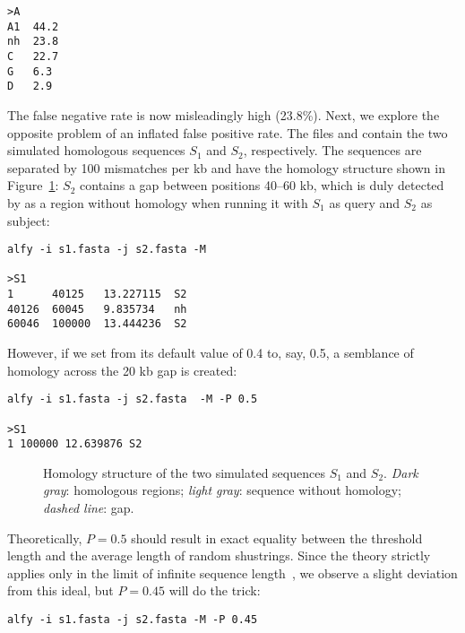 \documentclass[a4paper]{article}
\begin{document}
\begin{itemize}
\begin{verbatim}
>A
A1  44.2
nh  23.8
C   22.7
G   6.3
D   2.9
\end{verbatim}
The false negative rate is now misleadingly high (23.8\%).
\I Next, we explore the opposite problem of an inflated false positive
rate. The files  and  contain the two
simulated homologous sequences $S_1$ and $S_2$, respectively. The sequences are
separated by 100 mismatches per kb and have the homology structure
shown in Figure~\ref{fig:hom}: $S_2$ contains a gap between positions
40--60 kb, which is duly detected by  as a region without homology when
running it with $S_1$ as query and $S_2$ as subject:
\begin{verbatim}
alfy -i s1.fasta -j s2.fasta -M

>S1
1      40125   13.227115  S2
40126  60045   9.835734   nh
60046  100000  13.444236  S2
\end{verbatim}
However, if we set  from its default value of 0.4 to, say, 0.5,
a semblance of homology across the 20 kb gap is created:
\begin{verbatim}
alfy -i s1.fasta -j s2.fasta  -M -P 0.5

>S1
1 100000 12.639876 S2
\end{verbatim}
\begin{figure}
\begin{center}

\end{center}
\caption{Homology structure of the two simulated sequences $S_1$ and
  $S_2$. \textit{Dark gray}: homologous regions; \textit{light gray}:
  sequence without homology; \textit{dashed line}: gap.}\label{fig:hom}
\end{figure}

\I Theoretically, $P=0.5$ should result in exact equality between
the threshold length and the average length of random shustrings. Since
the theory strictly applies only in the limit of infinite sequence
length~\cite{hau09:est}, we observe a slight deviation from this
ideal, but $P=0.45$ will do the trick:
\begin{verbatim}
alfy -i s1.fasta -j s2.fasta -M -P 0.45


\end{verbatim}
\end{itemize}
\end{document}
